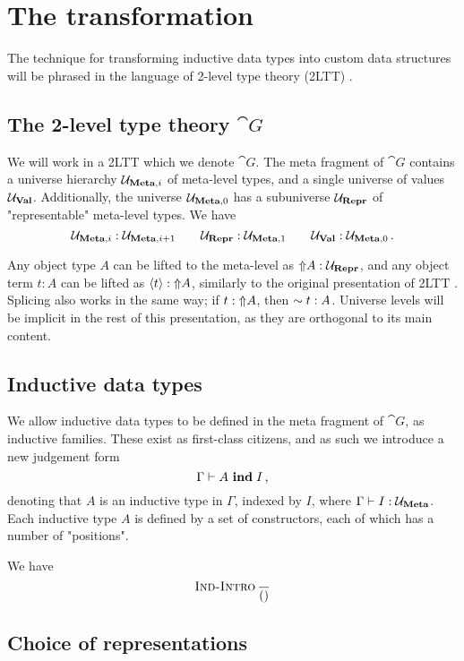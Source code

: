 \section{The transformation}\label{sec:prelim}

The technique for transforming inductive data types into custom data structures
will be phrased in the language of 2-level type theory (2LTT)
\cite{Kovacs2022-vb}.

\subsection{The 2-level type theory $\cat{G}$}

We will work in a 2LTT which we denote $\cat{G}$. The meta fragment of
$\cat{G}$ contains a universe hierarchy $\univ{\mta{Meta},i}$ of meta-level
types, and a single universe of values $\Uv$. Additionally, the universe
$\univ{\mta{Meta},0}$ has a subuniverse $\Ur$ of "representable" meta-level
types. We have
\[
  \univ{\mta{Meta},i} : \univ{\mta{Meta},i+1} \qquad \Ur : \univ{\mta{Meta},1} \qquad \Uv : \univ{\mta{Meta},0} \,.
\]

Any object type $A$ can be lifted to the meta-level as $\lift A : \Ur$, and any
object term $t : A$ can be lifted as $\quot t : \lift A$, similarly to the
original presentation of 2LTT \cite{Kovacs2022-vb}. Splicing also works in the
same way; if $t : \lift A$, then $\splice t : A$. Universe levels will be
implicit in the rest of this presentation, as they are orthogonal to its main
content.

\subsection{Inductive data types}

We allow inductive data types to be defined in the meta fragment of $\cat{G}$,
as inductive families. These exist as first-class citizens, and as such we
introduce a new judgement form
\[
  \Gamma \vdash \isind{A}{I} \,,
\]
denoting that $A$ is an inductive type in $\Gamma$, indexed by $I$, where
$\Gamma \vdash I : \Um$. Each inductive type $A$ is defined by a set of
constructors, each of which has a number of "positions".

We have
\[
  \infrule[Ind-Intro]{}{()}
\]

\subsection{Choice of representations}

